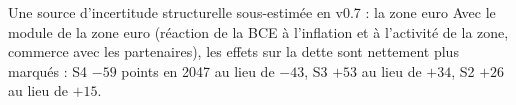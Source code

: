 \begin{encadre}{Une source d'incertitude structurelle sous-estimée en v0.7 : la zone euro}
Avec le module de la zone euro (réaction de la BCE à l'inflation et à l'activité de la zone, commerce avec les
partenaires), les effets sur la dette sont nettement plus marqués : S4 $-59$ points en 2047 au lieu de $-43$, S3 $+53$
au lieu de $+34$, S2 $+26$ au lieu de $+15$. 
\end{encadre}
